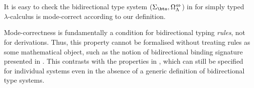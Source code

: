 It is easy to check the bidirectional type system $(\Sigma_{\bto}, \Omega^{\Leftrightarrow}_{\Lambda}$) in  for simply typed $\lambda$-calculus is mode-correct according to our definition.

\begin{remark}
  Mode-correctness is fundamentally a condition for bidirectional typing \emph{rules}, not for derivations.
  Thus, this property cannot be formalised without treating rules as some mathematical object, such as the notion of bidirectional binding signature presented in .
  This contrasts with the properties in , which can still be specified for individual systems even in the absence of a generic definition of bidirectional type systems.
\end{remark}

